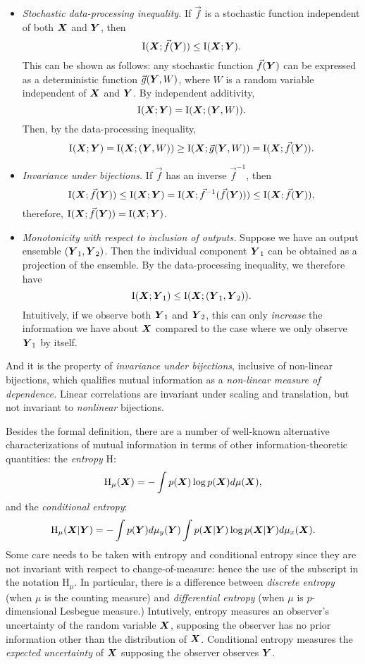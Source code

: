 \begin{itemize}
\item \emph{Stochastic data-processing inequality.}  If $\vec{f}$ is a stochastic function independent of both $\boldsymbol{X}$ and $\boldsymbol{Y}$, then
\[
\text{I}(\boldsymbol{X}; \vec{f}(\boldsymbol{Y})) \leq \text{I}(\boldsymbol{X}; \boldsymbol{Y}).
\]
This can be shown as follows: any stochastic function $\vec{f}(\boldsymbol{Y})$
can be expressed as a deterministic function $\vec{g}(\boldsymbol{Y}, W)$, where
$W$ is a random variable independent of $\boldsymbol{X}$ and $\boldsymbol{Y}$.
By independent additivity,
\[
\text{I}(\boldsymbol{X}; \boldsymbol{Y}) = \text{I}(\boldsymbol{X}; (\boldsymbol{Y}, W)).
\]
Then, by the data-processing inequality,
\[
\text{I}(\boldsymbol{X}; \boldsymbol{Y}) = \text{I}(\boldsymbol{X}; (\boldsymbol{Y}, W)) \geq \text{I}(\boldsymbol{X}; \vec{g}(\boldsymbol{Y}, W)) = \text{I}(\boldsymbol{X}; \vec{f}(\boldsymbol{Y})).
\]
\item \emph{Invariance under bijections.} If $\vec{f}$ has an inverse $\vec{f}^{-1}$, then 
\[
\text{I}(\boldsymbol{X}; \vec{f}(\boldsymbol{Y})) \leq \text{I}(\boldsymbol{X}; \boldsymbol{Y}) = \text{I}(\boldsymbol{X}; \vec{f}^{-1}(\vec{f}(\boldsymbol{Y}))) \leq \text{I}(\boldsymbol{X}; \vec{f}(\boldsymbol{Y})),
\]
therefore, $\text{I}(\boldsymbol{X}; \vec{f}(\boldsymbol{Y})) = \text{I}(\boldsymbol{X}; \boldsymbol{Y})$.
\item \emph{Monotonicity with respect to inclusion of outputs.}  Suppose we have an output ensemble $(\boldsymbol{Y}_1,\boldsymbol{Y}_2)$.  Then the individual component $\boldsymbol{Y}_1$ can be obtained as a projection of the ensemble.  By the data-processing inequality, we therefore have
\[
\text{I}(\boldsymbol{X}; \boldsymbol{Y}_1) \leq \text{I}(\boldsymbol{X}; (\boldsymbol{Y}_1, \boldsymbol{Y}_2)).
\]
Intuitively, if we observe both $\boldsymbol{Y}_1$ and $\boldsymbol{Y}_2$, this can
only \emph{increase} the information we have about $\boldsymbol{X}$ compared to
the case where we only observe $\boldsymbol{Y}_1$ by itself.
\end{itemize}
And it is the property of \emph{invariance under bijections},
inclusive of non-linear bijections, which qualifies mutual information
as a \emph{non-linear measure of dependence.}  Linear correlations are
invariant under scaling and translation, but not invariant
to \emph{nonlinear} bijections.

Besides the formal definition, there are a number of well-known alternative
characterizations of mutual information in terms of other
information-theoretic quantities: the \emph{entropy} $\text{H}$:
\[
\text{H}_\mu(\boldsymbol{X}) = -\int p(\boldsymbol{X}) \log p(\boldsymbol{X}) d\mu(\boldsymbol{X}),
\]
and the \emph{conditional entropy}:
\[
\text{H}_\mu(\boldsymbol{X}|\boldsymbol{Y}) = -\int p(\boldsymbol{Y}) d\mu_y(\boldsymbol{Y}) \int p(\boldsymbol{X}|\boldsymbol{Y}) \log p(\boldsymbol{X}|\boldsymbol{Y}) d\mu_x(\boldsymbol{X}).
\]
Some care needs to be taken with entropy and conditional entropy since
they are not invariant with respect to change-of-measure: hence the
use of the subscript in the notation $\text{H}_\mu$.  In particular,
there is a difference between \emph{discrete entropy} (when $\mu$ is
the counting measure) and \emph{differential entropy} (when $\mu$ is
$p$-dimensional Lesbegue measure.)  Intutively, entropy measures an
observer's uncertainty of the random variable $\boldsymbol{X}$, supposing the
observer has no prior information other than the distribution of
$\boldsymbol{X}$. Conditional entropy measures the \emph{expected uncertainty} of
$\boldsymbol{X}$ supposing the observer observes $\boldsymbol{Y}$.

